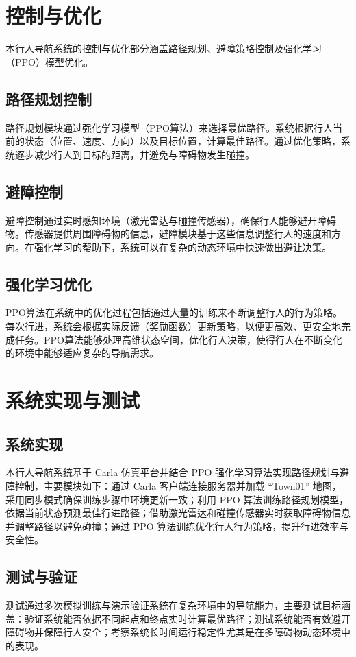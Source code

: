 \section{控制与优化}

本行人导航系统的控制与优化部分涵盖路径规划、避障策略控制及强化学习（PPO）模型优化。

\subsection{路径规划控制}
路径规划模块通过强化学习模型（PPO算法）来选择最优路径。系统根据行人当前的状态（位置、速度、方向）以及目标位置，计算最佳路径。通过优化策略，系统逐步减少行人到目标的距离，并避免与障碍物发生碰撞。

\subsection{避障控制}
避障控制通过实时感知环境（激光雷达与碰撞传感器），确保行人能够避开障碍物。传感器提供周围障碍物的信息，避障模块基于这些信息调整行人的速度和方向。在强化学习的帮助下，系统可以在复杂的动态环境中快速做出避让决策。

\subsection{强化学习优化}
PPO算法在系统中的优化过程包括通过大量的训练来不断调整行人的行为策略。每次行进，系统会根据实际反馈（奖励函数）更新策略，以便更高效、更安全地完成任务。PPO算法能够处理高维状态空间，优化行人决策，使得行人在不断变化的环境中能够适应复杂的导航需求。

\section{系统实现与测试}

\subsection{系统实现}

本行人导航系统基于 Carla 仿真平台并结合 PPO 强化学习算法实现路径规划与避障控制，主要模块如下：通过 Carla 客户端连接服务器并加载 “Town01” 地图，采用同步模式确保训练步骤中环境更新一致；利用 PPO 算法训练路径规划模型，依据当前状态预测最佳行进路径；借助激光雷达和碰撞传感器实时获取障碍物信息并调整路径以避免碰撞；通过 PPO 算法训练优化行人行为策略，提升行进效率与安全性。

\subsection{测试与验证}

测试通过多次模拟训练与演示验证系统在复杂环境中的导航能力，主要测试目标涵盖：验证系统能否依据不同起点和终点实时计算最优路径；测试系统能否有效避开障碍物并保障行人安全；考察系统长时间运行稳定性尤其是在多障碍物动态环境中的表现。
